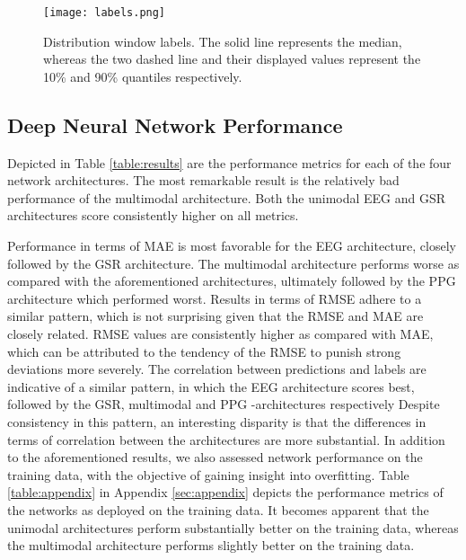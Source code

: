 \documentclass[fleqn,11pt]{paper}
\begin{document}
\vspace{3mm}
\begin{figure}[h]
\centering
\texttt{[image: labels.png]}
\caption{Distribution window labels. The solid line represents the median, whereas the two dashed line and their displayed values represent the 10\% and 90\% quantiles respectively. }\label{fig:labels}
\end{figure}

\subsection{Deep Neural Network Performance}
Depicted in Table \ref{table:results} are the performance metrics for each of the four network architectures. The most remarkable result is the relatively bad performance of the multimodal architecture. Both the unimodal EEG and GSR architectures score consistently higher on all metrics.

Performance in terms of MAE is most favorable for the EEG architecture, closely followed by the GSR architecture. The multimodal architecture performs worse as compared with the aforementioned architectures, ultimately followed by the PPG architecture which performed worst. Results in terms of RMSE adhere to a similar pattern, which is not surprising given that the RMSE and MAE are closely related. RMSE values are consistently higher as compared with MAE, which can be attributed to the tendency of the RMSE to punish strong deviations more severely. The correlation between predictions and labels are indicative of a similar pattern, in which the EEG architecture scores best, followed by the GSR, multimodal and PPG -architectures respectively Despite consistency in this pattern, an interesting disparity is that the differences in terms of correlation between the architectures are more substantial. In addition to the aforementioned results, we also assessed network performance on the training data, with the objective of gaining insight into overfitting. Table \ref{table:appendix} in Appendix \ref{sec:appendix} depicts the performance metrics of the networks as deployed on the training data.  It becomes apparent that the unimodal architectures perform substantially better on the training data, whereas the multimodal architecture performs slightly better on the training data. 
\end{document}

